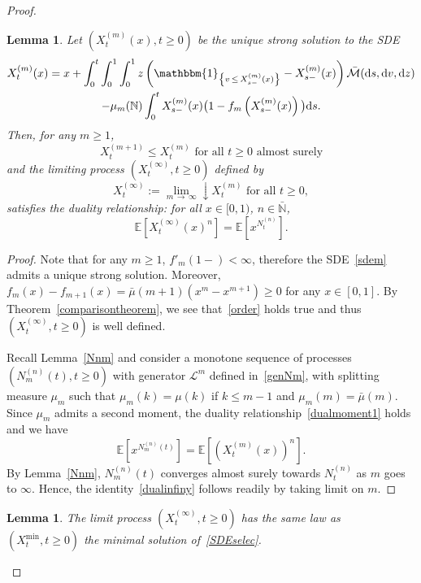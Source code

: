 \documentclass[10pt]{amsart}
\newtheorem{lemm}[theo]{Lemma}\newtheorem{prop}[theo]{Proposition}\newtheorem{coro}[theo]{Corollary}\newtheorem{conj}[theo]{Conjecture}
\theoremstyle{definition}\newtheorem{defi}[theo]{Definition}\newtheorem{rema}[theo]{Remark}\newtheorem{exam}[theo]{Example}\newtheorem{exem}[theo]{Example}\newtheorem{nota}[theo]{Notation}
\newcommand{\ddr}{\mathrm{d}}
\newcommand{\bbmun}{\mathbbm{1}}
\newcommand{\bbN}{\mathbb{N}}
\newcommand{\bbE}{\mathbb{E}}
\newcommand{\clM}{\mathcal{M}}
\newcommand{\clL}{\mathcal{L}}
\begin{document}
\begin{proof}
\begin{lemm}\label{approxXa}
Let $(X_t^{(m)}(x),t\geq 0)$ be the unique strong solution to the SDE
\begin{multline}\label{sdem}
X^{(m)}_t(x)=x+\int_{0}^{t}\int_{0}^{1}\int_{0}^{1}z\left(\bbmun_{\left\{v\,\leq\,X^{(m)}_{s-}(x)\right\}}-X^{(m)}_{s-}(x)\right)\bar{\clM}(\ddr s,\ddr v, \ddr z) \\
-\mu_m(\bbN)\int_{0}^{t}X^{(m)}_{s-}(x)\big(1-f_m\left(X^{(m)}_{s-}(x)\right)\big)\ddr s.
\end{multline}
Then, for any $m\geq 1$,
\begin{equation}\label{order}
X_t^{(m+1)}\leq X_t^{(m)} \text{ for all } t\geq 0 \text{ almost surely}
\end{equation}
and the limiting process $(X^{(\infty)}_t,t\geq 0)$ defined by 
\[
X^{(\infty)}_t:=\underset{m\,\rightarrow\,\infty}{\lim}\!\! \downarrow X_t^{(m)} \text{ for all }t\geq 0,
\]
satisfies the duality relationship: for all $x\in [0,1)$, $n\in \bar{\bbN}$,
\begin{equation}\label{dualinfiny}
\bbE\left[X^{(\infty)}_t(x)^{n}\right]=\bbE\left[x^{N^{(n)}_t}\right].
\end{equation}
\end{lemm}

\begin{proof}
Note that for any $m\geq 1$, $f'_m(1-)<\infty$, therefore the SDE~\eqref{sdem} admits a unique strong solution. Moreover, $f_m(x)-f_{m+1}(x)=\bar{\mu}(m+1)(x^{m}-x^{m+1})\geq 0$ for any $x\in [0,1]$. By Theorem~\ref{comparisontheorem}, we see that~\eqref{order} holds true and thus $(X^{(\infty)}_t,t\geq 0) $ is well defined.

Recall Lemma~\ref{Nnm} and consider a monotone sequence of processes $(N^{(n)}_{m}(t),t\geq 0)$ with generator $\clL^m$ defined in~\eqref{genNm}, with splitting measure $\mu_m$ such that $\mu_{m}(k)=\mu(k)$ if $k\leq m-1$ and $\mu_m(m)=\bar{\mu}(m)$. Since $\mu_m$ admits a second moment, the duality relationship~\eqref{dualmoment1} holds and we have
\begin{equation}\label{dualm}
\bbE\left[x^{N_m^{(n)}(t)}\right]=\bbE\left[\left(X_t^{(m)}(x)\right)^{n}\right].
\end{equation}
By Lemma~\ref{Nnm}, $N_m^{(n)}(t)$ converges almost surely towards $N^{(n)}_t$ as $m$ goes to $\infty$. Hence, the identity~\eqref{dualinfiny} follows readily by taking limit on $m$.
\end{proof}

\begin{lemm}\label{identificationXinfinity}
The limit process $(X^{(\infty)}_t,t\geq 0)$ has the same law as $(X^{\min}_t,t\geq 0)$ the minimal solution of~\eqref{SDEselec}.
\end{lemm}


\end{proof}
\end{document}
